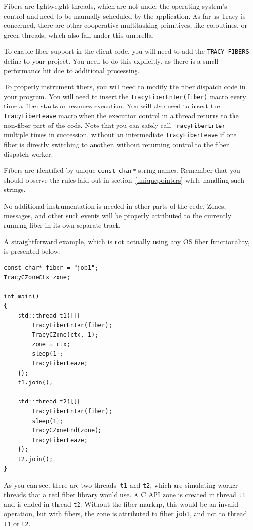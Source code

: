\documentclass[hidelinks,titlepage,a4paper]{article}
\begin{document}
Fibers are lightweight threads, which are not under the operating system's control and need to be manually scheduled by the application. As far as Tracy is concerned, there are other cooperative multitasking primitives, like coroutines, or green threads, which also fall under this umbrella.

To enable fiber support in the client code, you will need to add the \texttt{TRACY\_FIBERS} define to your project. You need to do this explicitly, as there is a small performance hit due to additional processing.

To properly instrument fibers, you will need to modify the fiber dispatch code in your program. You will need to insert the \texttt{TracyFiberEnter(fiber)} macro every time a fiber starts or resumes execution. You will also need to insert the \texttt{TracyFiberLeave} macro when the execution control in a thread returns to the non-fiber part of the code. Note that you can safely call \texttt{TracyFiberEnter} multiple times in succession, without an intermediate \texttt{TracyFiberLeave} if one fiber is directly switching to another, without returning control to the fiber dispatch worker.

Fibers are identified by unique \texttt{const char*} string names. Remember that you should observe the rules laid out in section~\ref{uniquepointers} while handling such strings.

No additional instrumentation is needed in other parts of the code. Zones, messages, and other such events will be properly attributed to the currently running fiber in its own separate track.

A straightforward example, which is not actually using any OS fiber functionality, is presented below:

\begin{lstlisting}
const char* fiber = "job1";
TracyCZoneCtx zone;

int main()
{
    std::thread t1([]{
        TracyFiberEnter(fiber);
        TracyCZone(ctx, 1);
        zone = ctx;
        sleep(1);
        TracyFiberLeave;
    });
    t1.join();

    std::thread t2([]{
        TracyFiberEnter(fiber);
        sleep(1);
        TracyCZoneEnd(zone);
        TracyFiberLeave;
    });
    t2.join();
}
\end{lstlisting}

As you can see, there are two threads, \texttt{t1} and \texttt{t2}, which are simulating worker threads that a real fiber library would use. A C API zone is created in thread \texttt{t1} and is ended in thread \texttt{t2}. Without the fiber markup, this would be an invalid operation, but with fibers, the zone is attributed to fiber \texttt{job1}, and not to thread \texttt{t1} or \texttt{t2}.
\end{document}
